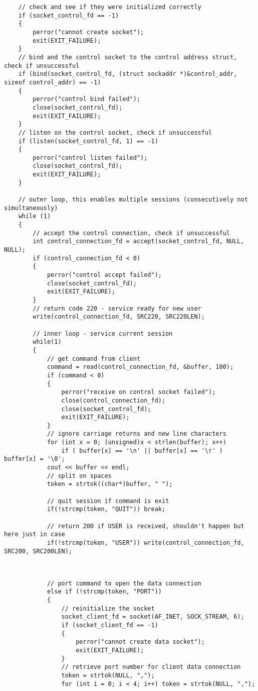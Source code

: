 \documentclass[12pt,letter,titlepage]{article}
\begin{document}
{{\begin{verbatim}
	// check and see if they were initialized correctly
	if (socket_control_fd == -1)
	{
		perror("cannot create socket");
		exit(EXIT_FAILURE);
	}
	// bind and the control socket to the control address struct, check if unsuccessful
	if (bind(socket_control_fd, (struct sockaddr *)&control_addr, sizeof control_addr) == -1)
	{
		perror("control bind failed");
		close(socket_control_fd);
		exit(EXIT_FAILURE);
	}
	// listen on the control socket, check if unsuccessful
	if (listen(socket_control_fd, 1) == -1)
	{
		perror("control listen failed");
		close(socket_control_fd);
		exit(EXIT_FAILURE);
	}

	// outer loop, this enables multiple sessions (consecutively not simultaneously)
	while (1)
	{
		// accept the control connection, check if unsuccessful
		int control_connection_fd = accept(socket_control_fd, NULL, NULL);
		if (control_connection_fd < 0)
		{
			perror("control accept failed");
			close(socket_control_fd);
			exit(EXIT_FAILURE);
		}
		// return code 220 - service ready for new user
		write(control_connection_fd, SRC220, SRC220LEN);

		// inner loop - service current session
		while(1)
		{
			// get command from client
			command = read(control_connection_fd, &buffer, 100);
			if (command < 0)
			{
				perror("receive on control socket failed");
				close(control_connection_fd);
				close(socket_control_fd);
				exit(EXIT_FAILURE);
			}
			// ignore carriage returns and new line characters
			for (int x = 0; (unsigned)x < strlen(buffer); x++) 
				if ( buffer[x] == '\n' || buffer[x] == '\r' ) buffer[x] = '\0';
			cout << buffer << endl;
			// split on spaces
			token = strtok((char*)buffer, " ");

			// quit session if command is exit
			if(!strcmp(token, "QUIT")) break;

			// return 200 if USER is received, shouldn't happen but here just in case
			if(!strcmp(token, "USER")) write(control_connection_fd, SRC200, SRC200LEN);
			
\end{verbatim}
\pagebreak
\begin{verbatim}

			// port command to open the data connection
			else if (!strcmp(token, "PORT"))
			{
				// reinitialize the socket
				socket_client_fd = socket(AF_INET, SOCK_STREAM, 6);
				if (socket_client_fd == -1)
				{
					perror("cannot create data socket");
					exit(EXIT_FAILURE);
				}
				// retrieve port number for client data connection
				token = strtok(NULL, ",");
				for (int i = 0; i < 4; i++) token = strtok(NULL, ",");


\end{verbatim}}}
\end{document}
